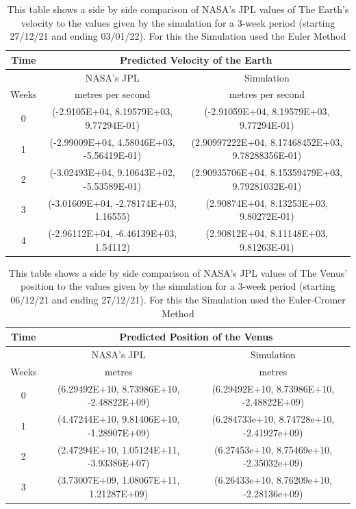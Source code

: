 \documentclass[a4paper,10pt]{article}
\begin{document}
\begin{table}[htp!]
\begin{center}
\begin{tabular}{|c|c|c|}
\hline 
Time & \multicolumn{2}{|c|}{Predicted Velocity of the Earth} \\
\hline
  & NASA's JPL & Simulation \\
Weeks & metres per second & metres per second\\
\hline
   0 & (-2.9105E+04, 8.19579E+03, 9.77294E-01) & (-2.91059E+04, 8.19579E+03, 9.77294E-01) \\ 
   1 & (-2.99009E+04, 4.58046E+03, -5.56419E-01) & (2.90997222E+04, 8.17468452E+03, 9.78288356E-01)  \\
   2 & (-3.02493E+04, 9.10643E+02, -5.53589E-01) & (2.90935706E+04, 8.15359479E+03, 9.79281032E-01) \\
   3 & (-3.01609E+04, -2.78174E+03, 1.16555) & (2.90874E+04, 8.13253E+03, 9.80272E-01) \\
   4 & (-2.96112E+04, -6.46139E+03, 1.54112) & (2.90812E+04, 8.11148E+03, 9.81263E-01)\\
   
\hline 
\end{tabular}
\end{center}
\caption{\label{table:Magnitude of Conserved Quantities} This table shows a side by side comparison of NASA's JPL values of The Earth's velocity to the values given by the simulation for a 3-week period (starting 27/12/21 and ending 03/01/22). For this the Simulation used the Euler Method}
\end{table}
\begin{table}[htb!]
\begin{center}
\begin{tabular}{|c|c|c|}
\hline 
Time & \multicolumn{2}{|c|}{Predicted Position of the Venus}  \\
\hline
  & NASA's JPL & Simulation\\
Weeks & metres & metres \\
\hline
   0 & (6.29492E+10, 8.73986E+10, -2.48822E+09) & (6.29492E+10, 8.73986E+10, -2.48822E+09)  \\ 
   1 & (4.47244E+10, 9.81406E+10, -1.28907E+09) & (6.284733e+10,  8.74728e+10, -2.41927e+09)\\
   2 & (2.47294E+10, 1.05124E+11, -3.93386E+07) & (6.27453e+10,  8.75469e+10, -2.35032e+09)\\
   3 & (3.73007E+09, 1.08067E+11, 1.21287E+09) & (6.26433e+10,  8.76209e+10, -2.28136e+09)   \\
   
\hline 
\end{tabular}
\end{center}
\caption{\label{table:Magnitude of Conserved Quantities} This table shows a side by side comparison of NASA's JPL values of The Venus' position to the values given by the simulation for a 3-week period (starting 06/12/21 and ending 27/12/21). For this the Simulation used the Euler-Cromer Method}
\end{table}
\end{document}
